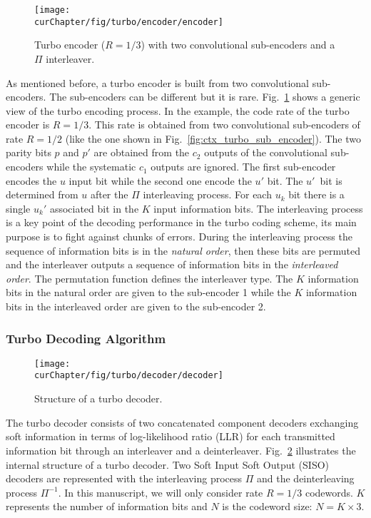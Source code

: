 \begin{figure}[htp]
  \centering
  \texttt{[image: \\curChapter/fig/turbo/encoder/encoder]}
  \caption{Turbo encoder ($R = 1/3$) with two convolutional sub-encoders and a
    $\Pi$ interleaver.}
  \label{fig:ctx_turbo_encoder}
\end{figure}

As mentioned before, a turbo encoder is built from two convolutional
sub-encoders. The sub-encoders can be different but it is rare.
Fig.~\ref{fig:ctx_turbo_encoder} shows a generic view of the turbo encoding
process. In the example, the code rate of the turbo encoder is $R = 1/3$. This
rate is obtained from two convolutional sub-encoders of rate $R = 1/2$ (like the
one shown in Fig.~\ref{fig:ctx_turbo_sub_encoder}). The two parity bits $p$ and
$p'$ are obtained from the $c_2$ outputs of the convolutional sub-encoders while
the systematic $c_1$ outputs are ignored. The first sub-encoder encodes the
$u$ input bit while the second one encode the $u'$ bit. The $u'$~bit is
determined from $u$ after the $\Pi$ interleaving process. For each $u_k$ bit
there is a single $u_k'$ associated bit in the $K$ input information bits. The
interleaving process is a key point of the decoding performance in the turbo
coding scheme, its main purpose is to fight against chunks of errors. During the
interleaving process the sequence of information bits is in the \emph{natural
order}, then these bits are permuted and the interleaver outputs a sequence of
information bits in the \emph{interleaved order}. The permutation function
defines the interleaver type. The $K$ information bits in the natural order are
given to the sub-encoder 1 while the $K$ information bits in the interleaved
order are given to the sub-encoder 2.

\subsubsection{Turbo Decoding Algorithm}
\label{sec:turbo_overview}

\begin{figure}[htp]
  \centering
  \texttt{[image: \\curChapter/fig/turbo/decoder/decoder]}
  \caption{Structure of a turbo decoder.}
  \label{fig:ctx_turbo_decoder}
\end{figure}

The turbo decoder consists of two concatenated component decoders exchanging
soft information in terms of log-likelihood ratio (LLR) for each transmitted
information bit through an interleaver and a deinterleaver.
Fig.~\ref{fig:ctx_turbo_decoder} illustrates the internal structure of a turbo
decoder. Two Soft Input Soft Output (SISO) decoders are represented with the
interleaving process $\Pi$ and the deinterleaving process $\Pi^{-1}$. In this
manuscript, we will only consider rate $R = 1/3$ codewords. $K$ represents the
number of information bits and $N$ is the codeword size: $N = K \times 3$.

